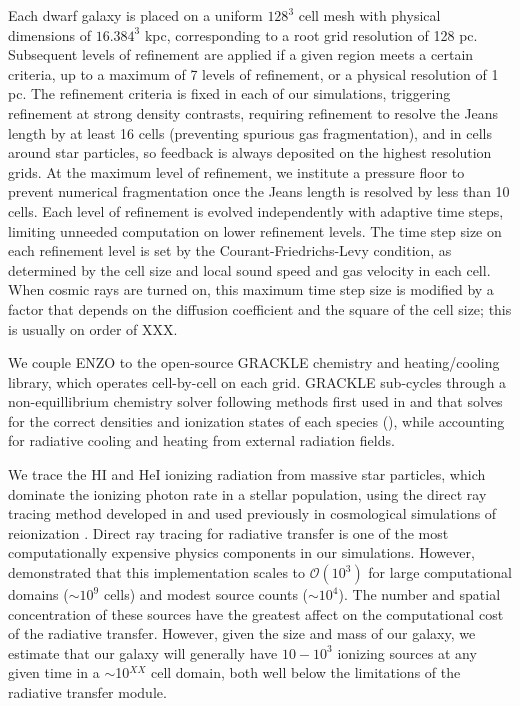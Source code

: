 \documentclass[11pt]{article}
\begin{document}
Each dwarf galaxy is placed on a uniform $128^3$ cell mesh with physical dimensions of $16.384^3$ kpc, corresponding to a root grid resolution of 128 pc. Subsequent levels of refinement are applied if a given region meets a certain criteria, up to a maximum of 7 levels of refinement, or a physical resolution of 1 pc. The refinement criteria is fixed in each of our simulations, triggering refinement at strong density contrasts, requiring refinement to resolve the Jeans length by at least 16 cells (preventing spurious gas fragmentation), and in cells around star particles, so feedback is always deposited on the highest resolution grids. At the maximum level of refinement, we institute a pressure floor to prevent numerical fragmentation once the Jeans length is resolved by less than 10 cells. Each level of refinement is evolved independently with adaptive time steps, limiting unneeded computation on lower refinement levels. The time step size on each refinement level is set by the Courant-Friedrichs-Levy condition, as determined by the cell size and local sound speed and gas velocity in each cell. When cosmic rays are turned on, this maximum time step size is modified by a factor that depends on the diffusion coefficient and the square of the cell size; this is usually on order of XXX.

We couple \textsc{ENZO} to the open-source \textsc{GRACKLE} chemistry and heating/cooling library, which operates cell-by-cell on each grid. \textsc{GRACKLE} sub-cycles through a non-equillibrium chemistry solver following methods first used in \cite{Anninos1997} and \cite{Abel1997} that solves for the correct densities and ionization states of each species (), while accounting for radiative cooling and heating from external radiation fields.

We trace the HI and HeI ionizing radiation from massive star particles, which dominate the ionizing photon rate in a stellar population, using the direct ray tracing method developed in \cite{WiseAbel2011} and used previously in cosmological simulations of reionization \citep{Wise2012a, WiseAbel2012,Wise2014, Kim2013a, Kim2013b}. Direct ray tracing for radiative transfer is one of the most computationally expensive physics components in our simulations. However, \cite{WiseAbel2011} demonstrated that this implementation scales to $\mathcal{O}(10^{3})$ for large computational domains ($\sim 10^9$ cells) and modest source counts ($\sim10^4$). The number and spatial concentration of these sources have the greatest affect on the computational cost of the radiative transfer. However, given the size and mass of our galaxy, we estimate that our galaxy will generally have $10 - 10^3$ ionizing sources at any given time in a $\sim$10$^{XX}$ cell domain, both well below the limitations of the radiative transfer module.
\end{document}
